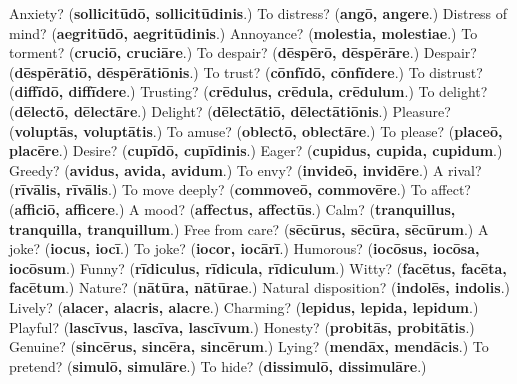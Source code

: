 \begin{tcolorbox}[breakable,colback=teal!4,colframe=teal!35!black,title={Before you move on}]
Anxiety? (\textbf{sollicitūdō, sollicitūdinis}.) To distress? (\textbf{angō, angere}.) Distress of mind? (\textbf{aegritūdō, aegritūdinis}.) Annoyance? (\textbf{molestia, molestiae}.) To torment? (\textbf{cruciō, cruciāre}.) To despair? (\textbf{dēspērō, dēspērāre}.) Despair? (\textbf{dēspērātiō, dēspērātiōnis}.) To trust? (\textbf{cōnfīdō, cōnfīdere}.) To distrust? (\textbf{diffīdō, diffīdere}.) Trusting? (\textbf{crēdulus, crēdula, crēdulum}.) To delight? (\textbf{dēlectō, dēlectāre}.) Delight? (\textbf{dēlectātiō, dēlectātiōnis}.) Pleasure? (\textbf{voluptās, voluptātis}.) To amuse? (\textbf{oblectō, oblectāre}.) To please? (\textbf{placeō, placēre}.) Desire? (\textbf{cupīdō, cupīdinis}.) Eager? (\textbf{cupidus, cupida, cupidum}.) Greedy? (\textbf{avidus, avida, avidum}.) To envy? (\textbf{invideō, invidēre}.) A rival? (\textbf{rīvālis, rīvālis}.) To move deeply? (\textbf{commoveō, commovēre}.) To affect? (\textbf{afficiō, afficere}.) A mood? (\textbf{affectus, affectūs}.) Calm? (\textbf{tranquillus, tranquilla, tranquillum}.) Free from care? (\textbf{sēcūrus, sēcūra, sēcūrum}.) A joke? (\textbf{iocus, iocī}.) To joke? (\textbf{iocor, iocārī}.) Humorous? (\textbf{iocōsus, iocōsa, iocōsum}.) Funny? (\textbf{rīdiculus, rīdicula, rīdiculum}.) Witty? (\textbf{facētus, facēta, facētum}.) Nature? (\textbf{nātūra, nātūrae}.) Natural disposition? (\textbf{indolēs, indolis}.) Lively? (\textbf{alacer, alacris, alacre}.) Charming? (\textbf{lepidus, lepida, lepidum}.) Playful? (\textbf{lascīvus, lascīva, lascīvum}.) Honesty? (\textbf{probitās, probitātis}.) Genuine? (\textbf{sincērus, sincēra, sincērum}.) Lying? (\textbf{mendāx, mendācis}.) To pretend? (\textbf{simulō, simulāre}.) To hide? (\textbf{dissimulō, dissimulāre}.)
\end{tcolorbox}
